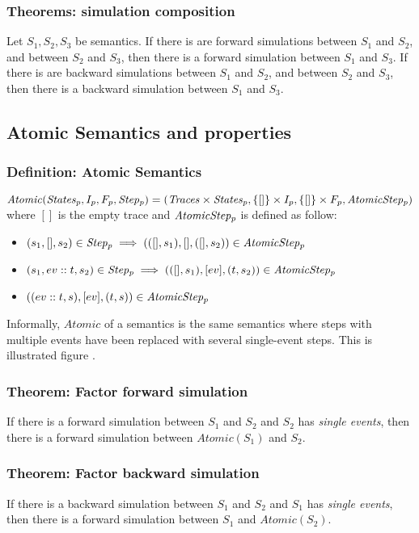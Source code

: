 \subsubsection{Theorems: simulation composition} Let $S_1,S_2,S_3$ be semantics.
If there is are forward simulations between $S_1$ and $S_2$, and between $S_2$ and $S_3$, then there is a forward simulation between $S_1$ and $S_3$.
If there is are backward simulations between $S_1$ and $S_2$, and between $S_2$ and $S_3$, then there is a backward simulation between $S_1$ and $S_3$.


\subsection{Atomic Semantics and properties}
\subsubsection{Definition: Atomic Semantics} $\mathit{Atomic}(\mathit{States_{p}},I_p,F_p,\mathit{Step_{p}}) = (\mathit{Traces}\times\mathit{States_{p}},\{[]\}\times I_p,\{[]\}\times F_p,\mathit{AtomicStep_{p}})$ where $[]$ is the empty trace and $\mathit{AtomicStep_{p}}$ is defined as follow:
\begin{itemize}
\item $(s_1,[],s_2)\in\mathit{Step_{p}}\implies(([],s_1),[],([],s_2))\in\mathit{AtomicStep_{p}}$
\item $(s_1,ev::t,s_2)\in\mathit{Step_{p}}\implies(([],s_1),[ev],(t,s_2))\in\mathit{AtomicStep_{p}}$
\item $((ev::t,s),[ev],(t,s))\in\mathit{AtomicStep_{p}}$
\end{itemize}
Informally, $\mathit{Atomic}$ of a semantics is the same semantics where steps with multiple events have been replaced with several single-event steps. This is illustrated figure .

\subsubsection{Theorem: Factor forward simulation} If there is a forward simulation between $S_1$ and $S_2$ and $S_2$ has \textit{single events}, then there is a forward simulation between $\mathit{Atomic}(S_1)$ and $S_2$.

\subsubsection{Theorem: Factor backward simulation} If there is a backward simulation between $S_1$ and $S_2$ and $S_1$ has \textit{single events}, then there is a forward simulation between $S_1$ and $\mathit{Atomic}(S_2)$.

